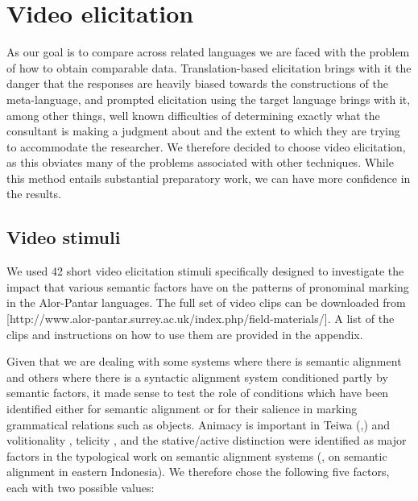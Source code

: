 \section{Video elicitation}
\label{sec:10:4}
As our goal is to compare across related languages we are faced with the problem of how to obtain comparable data. Translation-based elicitation brings with it the danger that the responses are heavily biased towards the constructions of the meta-language, and prompted elicitation using the target language brings with it, among other things, well known difficulties of determining exactly what the consultant is making a judgment about and the extent to which they are trying to accommodate the researcher. We therefore decided to choose video elicitation, as this obviates many of the problems associated with other techniques. While this method entails substantial preparatory work, we can have more confidence in the results.

\subsection{Video stimuli} 
\label{sec:10:4.1}
We used 42 short video elicitation stimuli specifically designed to investigate the impact that various semantic factors have on the patterns of pronominal marking in the Alor-Pantar languages. The full set of video clips can be downloaded from [http://www.alor-pantar.surrey.ac.uk/index.php/field-materials/]. A list of the clips and instructions on how to use them are provided in the appendix.

  Given that we are dealing with some systems where there is semantic alignment and others where there is a syntactic alignment system conditioned partly by semantic factors, it made sense to test the role of conditions which have been identified either for semantic alignment or for their salience in marking grammatical relations such as objects. Animacy  is important in Teiwa (\citealt[171]{Klamer2010grammar},\citealt{KlamerEtAl2006}) and volitionality , telicity , and the stative/active distinction were identified as major factors in the typological work on semantic alignment  systems (\citealt{Arkadiev2008}, \citealt{Klamer2008} on semantic alignment in eastern Indonesia). We therefore chose the following five factors, each with two possible values:
  
